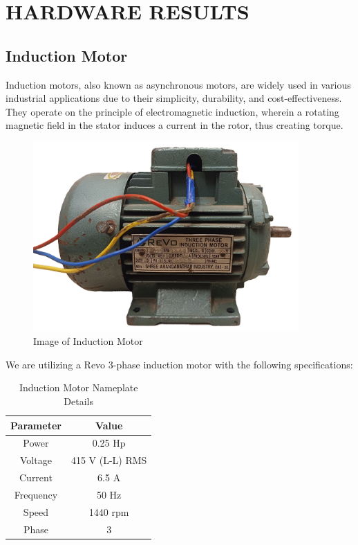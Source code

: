 \section{HARDWARE RESULTS}


\subsection{Induction Motor}

Induction motors, also known as asynchronous motors, are widely used in various industrial applications due to their simplicity, durability, and cost-effectiveness. They operate on the principle of electromagnetic induction, wherein a rotating magnetic field in the stator induces a current in the rotor, thus creating torque.

\begin{figure}[H]
	\centering
	\includegraphics[width=4.0in]{sections/section4/images/inductionMotor/revo.png}
	\caption{Image of Induction Motor}
\end{figure}

We are utilizing a Revo 3-phase induction motor with the following specifications:

\begin{table}[H]
	\centering
	\begin{tabular}{|c|c|}
		\hline
		\textbf{Parameter} & \textbf{Value} \\ \hline
		Power & 0.25 Hp \\ \hline
		Voltage & 415 V (L-L) RMS \\ \hline
		Current & 6.5 A \\ \hline
		Frequency & 50 Hz \\ \hline
		Speed & 1440 rpm \\ \hline
		Phase & 3 \\ \hline
	\end{tabular}
	\caption{Induction Motor Nameplate Details}
\end{table}



